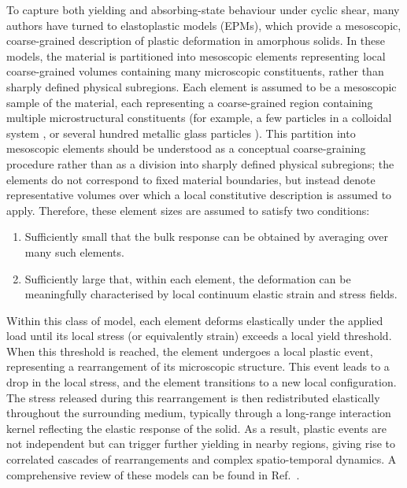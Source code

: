 To capture both yielding and absorbing-state behaviour under cyclic shear, many authors have turned to elastoplastic models (EPMs), which provide a mesoscopic, coarse-grained description of plastic deformation in amorphous solids. In these models, the material is partitioned into mesoscopic elements representing local coarse-grained volumes containing many microscopic constituents, rather than sharply defined physical subregions. Each element is assumed to be a mesoscopic sample of the material, each representing a coarse-grained region containing multiple microstructural constituents (for example, a few particles in a colloidal system \cite{Schall2007}, or several hundred metallic glass particles \cite{Pan2008}). This partition into mesoscopic elements should be understood as a conceptual coarse-graining procedure rather than as a division into sharply defined physical subregions; the elements do not correspond to fixed material boundaries, but instead denote representative volumes over which a local constitutive description is assumed to apply. Therefore, these element sizes are assumed to satisfy two conditions:
\begin{enumerate}
    \item Sufficiently small that the bulk response can be obtained by averaging over many such elements.
    \item Sufficiently large that, within each element, the deformation can be meaningfully characterised by local continuum elastic strain and stress fields.
\end{enumerate}

Within this class of model, each element deforms elastically under the applied load until its local stress (or equivalently strain) exceeds a local yield threshold. When this threshold is reached, the element undergoes a local plastic event, representing a rearrangement of its microscopic structure. This event leads to a drop in the local stress, and the element transitions to a new local configuration. The stress released during this rearrangement is then redistributed elastically throughout the surrounding medium, typically through a long-range interaction kernel reflecting the elastic response of the solid. As a result, plastic events are not independent but can trigger further yielding in nearby regions, giving rise to correlated cascades of rearrangements and complex spatio-temporal dynamics. A comprehensive review of these models can be found in Ref.~\cite{nicolas_deformation_2018}. 

